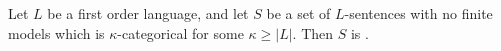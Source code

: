 \documentclass[12pt]{article}
\begin{document}
Let $L$ be a first order language, and let $S$ be a set of $L$-sentences with no finite models which is $\kappa$-categorical for some $\kappa \geq |L|$.  Then $S$ is .
\end{document}
